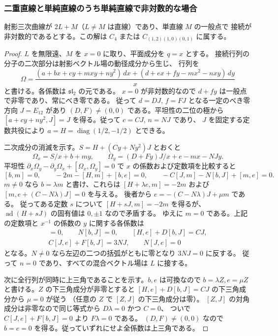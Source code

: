 \subsubsection{二重直線と単純直線のうち単純直線で非対数的な場合}
\begin{proposition}\label{p12:prop:doublebad}
射影三次曲線が $2L+M$（$L\ne M$ は直線）であり、単直線 $M$ の一般点で
接続が非対数的であるとする。この解は $C_4$ または
$C_{(1,2)(1,0)(0,1)}$ に属する。
\end{proposition}
\begin{proof}
$L$ を無限遠、$M$ を $x=0$ に取り、平面成分を $q=x$ とする。
接続行列の分子の二次部分は射影ベクトル場の動径成分から生じ、
行列を
\[
 \Omega=\frac{(a+bx+cy+mxy+ny^2)\,dx+
                (d+ex+fy-mx^2-nxy)\,dy}{x}
\]
と書ける。各係数は $\mathfrak{sl}_2$ の元である。
$x=0$ が非対数的なので $d+fy$ は一般点で非零であり、常にべき零である。
従って $d=DJ$, $f=FJ$ となる一定のべき零方向
$J=E_{12}$ があり $(D,F)\ne(0,0)$ である。平坦性の二位の極から
$[a+cy+ny^2,J]=J$ を得る。従って $c=CJ$, $n=NJ$ であり、
$J$ を固定する定数共役により $a=H=\operatorname{diag}(1/2,-1/2)$ とできる。

二次成分の消滅を示す。$S=H+(Cy+Ny^2)J$ とおくと
\[
 \Omega_x=S/x+b+my,\qquad
 \Omega_y=(D+Fy)J/x+e-mx-NJy.
\]
平坦性 $\partial_x\Omega_y-\partial_y\Omega_x+
[\Omega_x,\Omega_y]=0$ で $x$ の係数および定数項を比較すると
\[
 [b,m]=0,\qquad -2m-[H,m]+[b,e]=0,\qquad
 -C[J,m]-N[b,J]+[m,e]=0 .
\]
$m\ne0$ なら $b=\lambda m$ と書け、これらは
$[H+\lambda e,m]=-2m$ および $[m,e+(C-N\lambda)J]=0$ を与える。
後者から $e=-(C-N\lambda)J+\mu m$ である。
従ってある定数 $s$ について $[H+sJ,m]=-2m$ を得るが、
$\operatorname{ad}(H+sJ)$ の固有値は $0,\pm1$ なので矛盾する。
ゆえに $m=0$ である。上記の定数項と $x^{-1}$ の係数の
$y$ に関する各係数は
\begin{align*}
 [b,e]=0,\qquad N[b,J]=0,\qquad [H,e]+D[b,J]=CJ,\\
 C[J,e]+F[b,J]=3N J,\qquad N[J,e]=0
\end{align*}
となる。$N\ne0$ なら左辺の二つの括弧がともに零となり $3NJ=0$ に反する。
従って $n=0$ であり、すべての混合ベクトル場は $L$ に接する。

次に全行列が同時に上三角であることを示す。$b,e$ は可換なので
$b=\lambda Z,e=\mu Z$ と書ける。$Z$ の下三角成分が非零とすると
$[H,e]+D[b,J]=CJ$ の下三角成分から $\mu=0$ が従う
（任意の $Z$ で $[Z,J]$ の下三角成分は零）。
$[Z,J]$ の対角成分は非零なので同じ等式から $D\lambda=0$ かつ $C=0$、
ついで $C[J,e]+F[b,J]=0$ より $F\lambda=0$ である。
$(D,F)\ne(0,0)$ なので $b=e=0$ を得る。従っていずれにせよ全係数は上三角である。


\end{proof}

